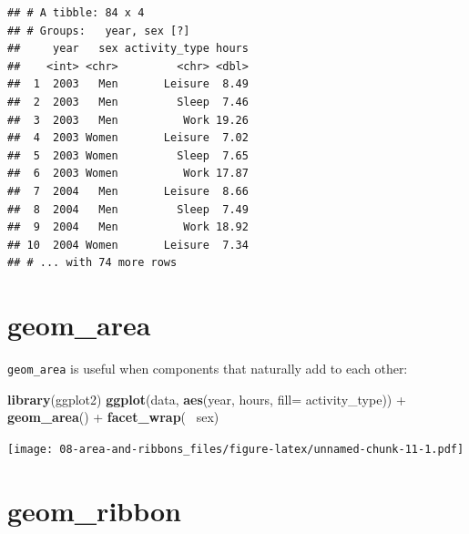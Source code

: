 \documentclass[]{book}
\newenvironment{Shaded}{\begin{snugshade}}{\end{snugshade}}
\newcommand{\KeywordTok}[1]{\textcolor[rgb]{0.13,0.29,0.53}{\textbf{{#1}}}}
\newcommand{\DataTypeTok}[1]{\textcolor[rgb]{0.13,0.29,0.53}{{#1}}}
\newcommand{\StringTok}[1]{\textcolor[rgb]{0.31,0.60,0.02}{{#1}}}
\newcommand{\NormalTok}[1]{{#1}}
\theoremstyle{definition}
\theoremstyle{definition}
\theoremstyle{remark}
\begin{document}
\begin{verbatim}
## # A tibble: 84 x 4
## # Groups:   year, sex [?]
##     year   sex activity_type hours
##    <int> <chr>         <chr> <dbl>
##  1  2003   Men       Leisure  8.49
##  2  2003   Men         Sleep  7.46
##  3  2003   Men          Work 19.26
##  4  2003 Women       Leisure  7.02
##  5  2003 Women         Sleep  7.65
##  6  2003 Women          Work 17.87
##  7  2004   Men       Leisure  8.66
##  8  2004   Men         Sleep  7.49
##  9  2004   Men          Work 18.92
## 10  2004 Women       Leisure  7.34
## # ... with 74 more rows
\end{verbatim}

\section{geom\_area}\label{geom_area}

\texttt{geom\_area} is useful when components that naturally add to each
other:

\begin{Shaded}
\begin{Highlighting}[]
\KeywordTok{library}\NormalTok{(ggplot2)}
\KeywordTok{ggplot}\NormalTok{(data, }\KeywordTok{aes}\NormalTok{(year, hours, }\DataTypeTok{fill=} \NormalTok{activity_type)) +}\StringTok{ }\KeywordTok{geom_area}\NormalTok{() +}\StringTok{ }\KeywordTok{facet_wrap}\NormalTok{(~}\StringTok{ }\NormalTok{sex) }
\end{Highlighting}
\end{Shaded}

\texttt{[image: 08-area-and-ribbons\_files/figure-latex/unnamed-chunk-11-1.pdf]}

\section{geom\_ribbon}\label{geom_ribbon}
\end{document}
